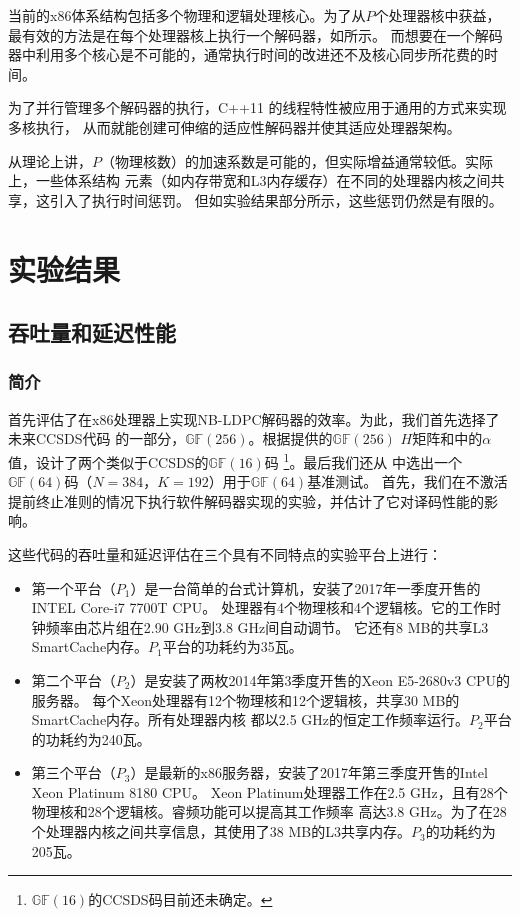 \documentclass{cjc}
\begin{document}
  当前的x86体系结构包括多个物理和逻辑处理核心。为了从$P$个处理器核中获益，
  最有效的方法是在每个处理器核上执行一个解码器，如\cite{gal_high-throughput_2016}所示。
  而想要在一个解码器中利用多个核心是不可能的，通常执行时间的改进还不及核心同步所花费的时间。

  为了并行管理多个解码器的执行，C++11 的线程特性被应用于通用的方式来实现多核执行，
  从而就能创建可伸缩的适应性解码器并使其适应处理器架构。

  从理论上讲，$P$（物理核数）的加速系数是可能的，但实际增益通常较低。实际上，一些体系结构
  元素（如内存带宽和L3内存缓存）在不同的处理器内核之间共享，这引入了执行时间惩罚。
  但如实验结果部分所示，这些惩罚仍然是有限的。

\section{实验结果}\label{sec:experiment}
\subsection{吞吐量和延迟性能}
\subsubsection{简介}\label{sssec:experiment11}

  首先评估了在x86处理器上实现NB-LDPC解码器的效率。为此，我们首先选择了未来CCSDS代码\cite{CCSDS_2015}
  的一部分，$\mathbb{GF}(256)$。根据\cite{dolecek_non-binary_2014}提供的$\mathbb{GF}(256)$
  $H$矩阵和\cite{poulliat_design_2008}中的$\alpha$值，设计了两个类似于CCSDS的$\mathbb{GF}(16)$码
  \footnote{$\mathbb{GF}(16)$的CCSDS码目前还未确定。}。最后我们还从\cite{noauthor_helmling_nodate}
  中选出一个$\mathbb{GF}(64)$码（$N=384，K=192$）用于$\mathbb{GF}(64)$基准测试。
  首先，我们在不激活提前终止准则的情况下执行软件解码器实现的实验，并估计了它对译码性能的影响。
  
  这些代码的吞吐量和延迟评估在三个具有不同特点的实验平台上进行：
\begin{itemize}
  \item 第一个平台（$P_1$）是一台简单的台式计算机，安装了2017年一季度开售的INTEL Core-i7 7700T CPU。
  处理器有4个物理核和4个逻辑核。它的工作时钟频率由芯片组在2.90 GHz到3.8 GHz间自动调节。
  它还有8 MB的共享L3 SmartCache内存。$P_1$平台的功耗约为35瓦。 
  \item 第二个平台（$P_2$）是安装了两枚2014年第3季度开售的Xeon E5-2680v3 CPU的服务器。
  每个Xeon处理器有12个物理核和12个逻辑核，共享30 MB的SmartCache内存。所有处理器内核
  都以2.5 GHz的恒定工作频率运行。$P_2$平台的功耗约为240瓦。
  \item 第三个平台（$P_3$）是最新的x86服务器，安装了2017年第三季度开售的Intel Xeon Platinum 8180 CPU。
  Xeon Platinum处理器工作在2.5 GHz，且有28个物理核和28个逻辑核。睿频功能可以提高其工作频率
  高达3.8 GHz。为了在28个处理器内核之间共享信息，其使用了38 MB的L3共享内存。$P_3$的功耗约为205瓦。
\end{itemize}
  
\end{document}
